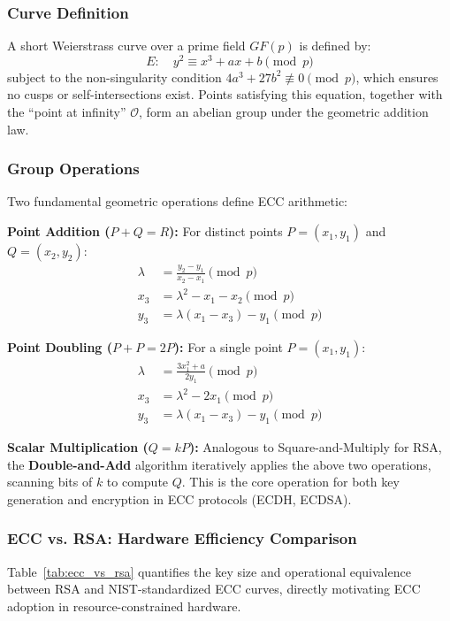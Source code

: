 \documentclass[conference, a4paper]{IEEEtran}
\begin{document}
\subsubsection*{Curve Definition}
A short Weierstrass curve over a prime field $GF(p)$ is defined by:
\begin{equation}
    E: \quad y^2 \equiv x^3 + ax + b \pmod{p}
\end{equation}
subject to the non-singularity condition $4a^3 + 27b^2 \not\equiv 0 \pmod{p}$, which ensures no cusps or self-intersections exist. Points satisfying this equation, together with the ``point at infinity'' $\mathcal{O}$, form an abelian group under the geometric addition law.

\subsubsection*{Group Operations}
Two fundamental geometric operations define ECC arithmetic:

\textbf{Point Addition ($P + Q = R$):} For distinct points $P = (x_1, y_1)$ and $Q = (x_2, y_2)$:
\begin{align}
    \lambda &= \frac{y_2 - y_1}{x_2 - x_1} \pmod{p} \\
    x_3 &= \lambda^2 - x_1 - x_2 \pmod{p} \\
    y_3 &= \lambda(x_1 - x_3) - y_1 \pmod{p}
\end{align}

\textbf{Point Doubling ($P + P = 2P$):} For a single point $P = (x_1, y_1)$:
\begin{align}
    \lambda &= \frac{3x_1^2 + a}{2y_1} \pmod{p} \\
    x_3 &= \lambda^2 - 2x_1 \pmod{p} \\
    y_3 &= \lambda(x_1 - x_3) - y_1 \pmod{p}
\end{align}

\textbf{Scalar Multiplication ($Q = kP$):} Analogous to Square-and-Multiply for RSA, the \textbf{Double-and-Add} algorithm iteratively applies the above two operations, scanning bits of $k$ to compute $Q$. This is the core operation for both key generation and encryption in ECC protocols (ECDH, ECDSA).

\subsubsection*{ECC vs. RSA: Hardware Efficiency Comparison}
Table~\ref{tab:ecc_vs_rsa} quantifies the key size and operational equivalence between RSA and NIST-standardized ECC curves, directly motivating ECC adoption in resource-constrained hardware.
\end{document}
